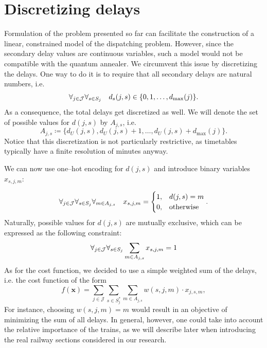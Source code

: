 \section{Discretizing delays}
Formulation of the problem presented so far can facilitate the construction of
a linear, constrained model of the dispatching problem. However, since the
secondary delay values are continuous variables, such a model would not be
compatible with the quantum annealer. We circumvent this issue by discretizing
the delays. One way to do it is to require that all secondary delays are
natural numbers, i.e.
\begin{equation}
  \forall_{j \in \mathcal{J}} \forall_{s \in S_{j}}\quad  d_{s}(j, s) \in \{0, 1, \ldots, d_{\max}(j)\}.
\end{equation}
As a consequence, the total delays get discretized as well. We will denote the
set of possible values for $d(j, s)$ by $A_{j, s}$, i.e.
\begin{equation}
  A_{j, s} \coloneq \{d_{U}(j, s), d_{U}(j, s) + 1, \ldots, d_{U}(j, s) + d_{\max}(j)\}.
\end{equation}
Notice that this discretization is not particularly restrictive, as timetables
typically have a finite resolution of minutes anyway.

We can now use one--hot encoding for $d(j, s)$ and introduce binary variables
$x_{s, j, m}$:

\begin{equation}
  \forall_{j \in \mathcal{J}}\forall_{s \in S_{j}} \forall_{m \in A_{j, s}} \quad x_{s,j,m} = \begin{cases}
    1, & d(j, s) = m      \\
    0, & \mbox{otherwise}
  \end{cases}.
\end{equation}
Naturally, possible values for $d(j, s)$ are mutually exclusive, which can be
expressed as the following constraint:
\begin{equation}
  \label{eq:onehotconstraint}
  \forall_{j \in \mathcal{J}}\forall_{s \in S_{j}} \sum_{m \in A_{j, s}} x_{s, j, m} = 1
\end{equation}
As for the cost function, we decided to use a simple weighted sum of the
delays, i.e. the cost function of the form
\begin{equation}
  \label{eq:qubo:cost}
  f(\mathbf{x}) = \sum_{j \in \mathcal{J}}\sum_{s \in S^{*}_{j}}\sum_{m \in A_{j,s}} w(s,j,m) \cdot x_{j,s,m},
\end{equation}
For instance, choosing $w(s, j, m)=m$ would result in an objective of
minimizing the sum of all delays. In general, however, one could take into
account the relative importance of the trains, as we will describe later when
introducing the real railway sections considered in our research.

